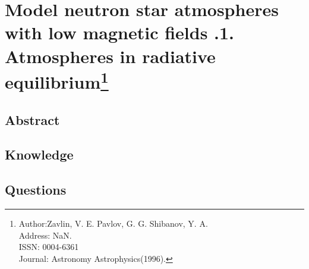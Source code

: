 \section[Model neutron star atmospheres with low magnetic fields .1. Atmospheres in radiative equilibrium]{Model neutron star atmospheres with low magnetic fields .1. Atmospheres in radiative equilibrium\protect\footnote{Author:Zavlin, V. E. Pavlov, G. G. Shibanov, Y. A. \\Address: NaN. \\ISSN: 0004-6361 \\Journal: Astronomy Astrophysics(1996).}}
\subsection{Abstract}

\subsection{Knowledge}

\subsection{Questions}